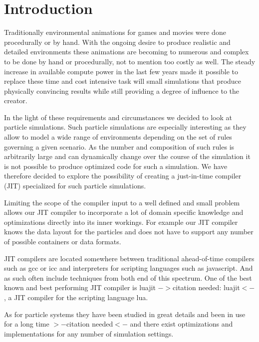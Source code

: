 \section{Introduction}\label{sec:intro}

Traditionally environmental animations for games and movies were done procedurally or by hand. With the ongoing desire to produce realistic and detailed environments these animations are becoming to numerous and complex to be done by hand or procedurally, not to mention too costly as well. The steady increase in available compute power in the last few years made it possible to replace these time and cost intensive task will small simulations that produce physically convincing results while still providing a degree of influence to the creator.

In the light of these requirements and circumstances we decided to look at particle simulations. Such particle simulations are especially interesting as they allow to model a wide range of environments depending on the set of rules governing a given scenario. As the number and composition of such rules is arbitrarily large and can dynamically change over the course of the simulation it is not possible to produce optimized code for such a simulation. We have therefore decided to explore the possibility of creating a just-in-time compiler (JIT) specialized for such particle simulations.

Limiting the scope of the compiler input to a well defined and small problem allows our JIT compiler to incorporate a lot of domain specific knowledge and optimizations directly into its inner workings. For example our JIT compiler knows the data layout for the particles and does not have to support any number of possible containers or data formats.

JIT compilers are located somewhere between traditional ahead-of-time compilers such as gcc or icc and interpreters for scripting languages such as javascript. And as such often include techniques from both end of this spectrum. One of the best known and best performing JIT compiler is luajit $->$citation needed: luajit$<-$, a JIT compiler for the scripting language lua.

As for particle systems they have been studied in great details and been in use for a long time $>-$citation needed$<-$ and there exist optimizations and implementations for any number of simulation settings.
